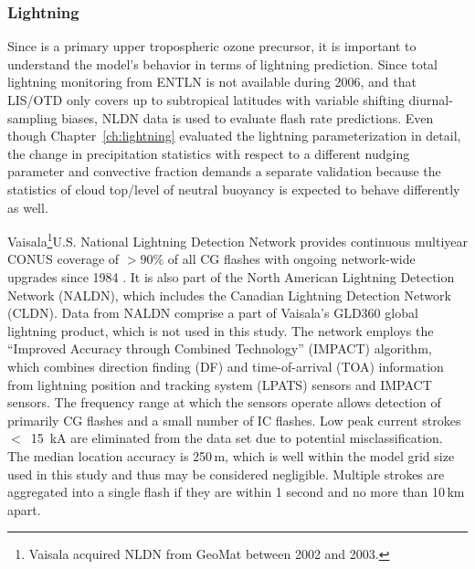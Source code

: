 
\subsubsection{Lightning}

Since {\lnox} is a primary upper tropospheric ozone precursor, it is important to understand the model's behavior in
terms of lightning prediction. Since total lightning monitoring from ENTLN is not available during 2006, and that LIS/OTD
only covers up to subtropical latitudes with variable shifting diurnal-sampling biases, NLDN data is used to evaluate flash rate predictions.
Even though Chapter~\ref{ch:lightning} evaluated the lightning parameterization in detail, the change in precipitation
statistics with respect to a different nudging parameter and convective fraction demands a separate validation because
the statistics of cloud top/level of neutral buoyancy is expected to behave differently as well.

Vaisala\footnote{Vaisala acquired NLDN from GeoMat between 2002 and 2003.}U.S. National Lightning Detection Network
\citep[NLDN;][]{Cummins:2009aa} provides continuous multiyear CONUS coverage of $>90\%$ of all CG flashes with ongoing
network-wide upgrades since 1984 \citep{Orville:2002uq,Orville:2010uq}. It is also part of the North American Lightning
Detection Network (NALDN), which includes the Canadian Lightning Detection Network (CLDN). Data from NALDN
comprise a part of Vaisala's GLD360 global lightning product, which is not used in this study. The network employs
the ``Improved Accuracy through Combined Technology'' (IMPACT) algorithm, which combines direction finding (DF)
and time-of-arrival (TOA) information from lightning position and tracking system (LPATS) sensors and IMPACT sensors.
The frequency range at which the sensors operate allows detection of primarily CG flashes and a small number of IC
flashes. Low peak current strokes $<$~15~\unit{kA} are eliminated from the data set due to potential misclassification. The
median location accuracy is 250\,\unit{m}, which is well within the model grid size used in this study and thus may be considered
negligible. Multiple strokes are aggregated into a single flash if they are within 1 second and no more than 10\,\unit{km} apart.

